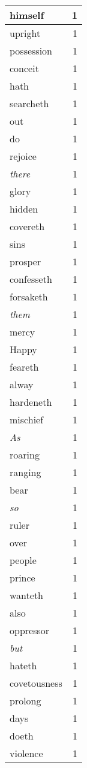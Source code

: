 \begin{center}
\begin{longtable}{l|r}
himself & 1\\ \hline 
upright & 1\\ \hline 
possession & 1\\ \hline 
conceit & 1\\ \hline 
hath & 1\\ \hline 
searcheth & 1\\ \hline 
out & 1\\ \hline 
do & 1\\ \hline 
rejoice & 1\\ \hline 
\emph{there} & 1\\ \hline 
glory & 1\\ \hline 
hidden & 1\\ \hline 
covereth & 1\\ \hline 
sins & 1\\ \hline 
prosper & 1\\ \hline 
confesseth & 1\\ \hline 
forsaketh & 1\\ \hline 
\emph{them} & 1\\ \hline 
mercy & 1\\ \hline 
Happy & 1\\ \hline 
feareth & 1\\ \hline 
alway & 1\\ \hline 
hardeneth & 1\\ \hline 
mischief & 1\\ \hline 
\emph{As} & 1\\ \hline 
roaring & 1\\ \hline 
ranging & 1\\ \hline 
bear & 1\\ \hline 
\emph{so} & 1\\ \hline 
ruler & 1\\ \hline 
over & 1\\ \hline 
people & 1\\ \hline 
prince & 1\\ \hline 
wanteth & 1\\ \hline 
also & 1\\ \hline 
oppressor & 1\\ \hline 
\emph{but} & 1\\ \hline 
hateth & 1\\ \hline 
covetousness & 1\\ \hline 
prolong & 1\\ \hline 
days & 1\\ \hline 
doeth & 1\\ \hline 
violence & 1\\ \hline 

\end{longtable}
\end{center}
